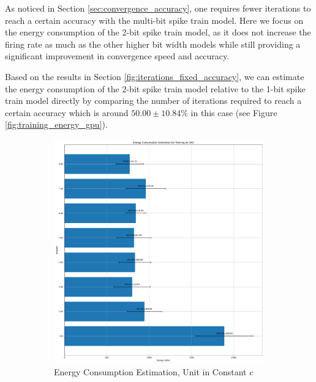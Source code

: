         As noticed in Section \ref{sec:convergence_accuracy}, one requires fewer iterations to reach a certain accuracy with the multi-bit spike train model. Here we focus on the energy consumption of the 2-bit spike train model, as it does not increase the firing rate as much as the other higher bit width models while still providing a significant improvement in convergence speed and accuracy. 

        Based on the results in Section \ref{fig:iterations_fixed_accuracy}, we can estimate the energy consumption of the 2-bit spike train model relative to the 1-bit spike train model directly by comparing the number of iterations required to reach a certain accuracy which is around $50.00\pm10.84\%$ in this case (see Figure \ref{fig:training_energy_gpu}). 
        \begin{figure}[!htpb]
            \centering
            \begin{subfigure}[H]{0.48\textwidth}
                \includegraphics[width=\textwidth]{../standard/FashionMNIST/plots/fashionmnist_train_energy_gpu.pdf}
                \caption{Energy Consumption Estimation, Unit in Constant $c$}
            \end{subfigure}
            \hfill
            \begin{subfigure}[H]{0.48\textwidth}

\end{subfigure}
\end{figure}
